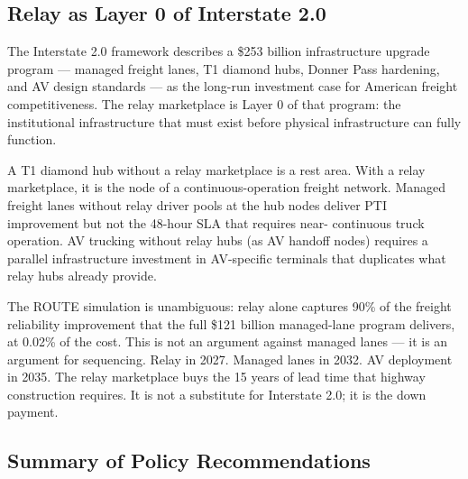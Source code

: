\subsection{Relay as Layer 0 of Interstate 2.0}

The Interstate 2.0 framework \citep{ROUTE_E2} describes a \$253 billion infrastructure
upgrade program --- managed freight lanes, T1 diamond hubs, Donner Pass hardening, and AV
design standards --- as the long-run investment case for American freight competitiveness.
The relay marketplace is Layer 0 of that program: the institutional infrastructure that must
exist before physical infrastructure can fully function.

A T1 diamond hub without a relay marketplace is a rest area. With a relay marketplace, it is
the node of a continuous-operation freight network. Managed freight lanes without relay driver
pools at the hub nodes deliver PTI improvement but not the 48-hour SLA that requires near-
continuous truck operation. AV trucking without relay hubs (as AV handoff nodes) requires
a parallel infrastructure investment in AV-specific terminals that duplicates what relay hubs
already provide.

The ROUTE simulation \citep{ROUTE_C1} is unambiguous: relay alone captures 90\% of the
freight reliability improvement that the full \$121 billion managed-lane program delivers,
at 0.02\% of the cost. This is not an argument against managed lanes --- it is an argument for
sequencing. Relay in 2027. Managed lanes in 2032. AV deployment in 2035. The relay marketplace
buys the 15 years of lead time that highway construction requires. It is not a substitute for
Interstate 2.0; it is the down payment.

\subsection{Summary of Policy Recommendations}

